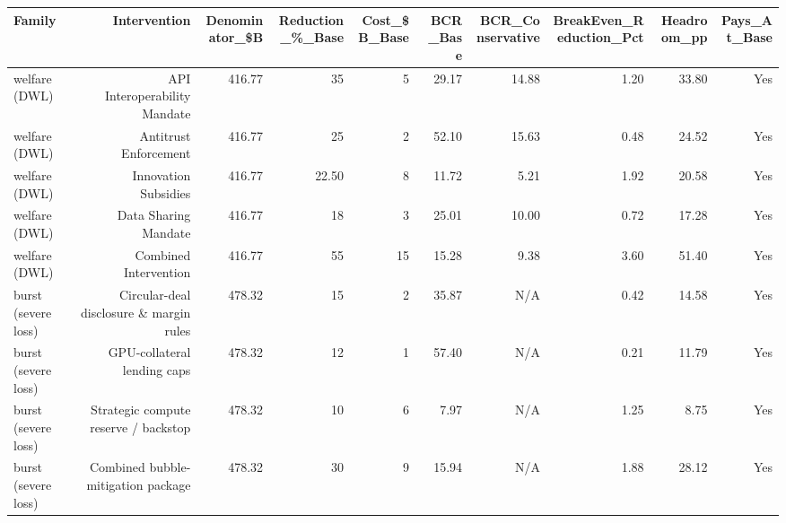 

\begin{tabular}{@{}lrrrrrrrrr@{}}
\toprule
Family & Intervention & Denominator\_\$B & Reduction\_\%\_Base & Cost\_\$B\_Base & BCR\_Base & BCR\_Conservative & BreakEven\_Reduction\_Pct & Headroom\_pp & Pays\_At\_Base \\
\midrule
welfare (DWL) & API Interoperability Mandate & 416.77 & 35 & 5 & 29.17 & 14.88 & 1.20 & 33.80 & Yes \\
welfare (DWL) & Antitrust Enforcement & 416.77 & 25 & 2 & 52.10 & 15.63 & 0.48 & 24.52 & Yes \\
welfare (DWL) & Innovation Subsidies & 416.77 & 22.50 & 8 & 11.72 & 5.21 & 1.92 & 20.58 & Yes \\
welfare (DWL) & Data Sharing Mandate & 416.77 & 18 & 3 & 25.01 & 10.00 & 0.72 & 17.28 & Yes \\
welfare (DWL) & Combined Intervention & 416.77 & 55 & 15 & 15.28 & 9.38 & 3.60 & 51.40 & Yes \\
burst (severe loss) & Circular-deal disclosure \& margin rules & 478.32 & 15 & 2 & 35.87 & N/A & 0.42 & 14.58 & Yes \\
burst (severe loss) & GPU-collateral lending caps & 478.32 & 12 & 1 & 57.40 & N/A & 0.21 & 11.79 & Yes \\
burst (severe loss) & Strategic compute reserve / backstop & 478.32 & 10 & 6 & 7.97 & N/A & 1.25 & 8.75 & Yes \\
burst (severe loss) & Combined bubble-mitigation package & 478.32 & 30 & 9 & 15.94 & N/A & 1.88 & 28.12 & Yes \\
\bottomrule
\end{tabular}